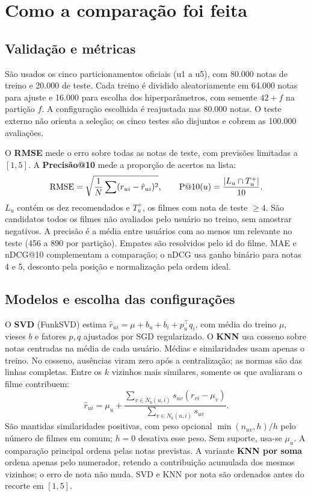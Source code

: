 \section{Como a comparação foi feita}
\subsection{Validação e métricas}
São usados os cinco particionamentos oficiais (u1 a u5), com 80.000 notas de
treino e 20.000 de teste. Cada treino é dividido aleatoriamente em 64.000
notas para ajuste e 16.000 para escolha dos hiperparâmetros, com semente
$42+f$ na partição $f$. A configuração escolhida é reajustada nas 80.000
notas. O teste externo não orienta a seleção; os cinco testes são disjuntos
e cobrem as 100.000 avaliações.

O \textbf{RMSE} mede o erro sobre todas as notas de teste, com previsões
limitadas a $[1,5]$. A \textbf{Precisão@10} mede a proporção de acertos na lista:
\[
\mathrm{RMSE}=\sqrt{\frac{1}{N}\sum(r_{ui}-\hat r_{ui})^2},\qquad
\mathrm{P}@10(u)=\frac{|L_u\cap T_u^+|}{10}.
\]
$L_u$ contém os dez recomendados e $T_u^+$, os filmes com nota de teste
$\geq4$. São candidatos todos os filmes não avaliados pelo usuário no treino,
sem amostrar negativos. A precisão é a média entre usuários com ao menos um
relevante no teste (456 a 890 por partição). Empates são resolvidos pelo id
do filme. MAE e nDCG@10 complementam a comparação; o nDCG usa ganho binário
para notas 4 e 5, desconto pela posição e normalização pela ordem ideal.

\subsection{Modelos e escolha das configurações}
O \textbf{SVD} (FunkSVD) estima $\hat r_{ui}=\mu+b_u+b_i+p_u^\top q_i$, com
média do treino $\mu$, vieses $b$ e fatores $p,q$ ajustados por SGD regularizado. O \textbf{KNN} usa
cosseno sobre notas centradas na média de cada usuário. Médias e similaridades
usam apenas o treino. No cosseno, ausências viram zero após a centralização;
as normas são das linhas completas. Entre os $k$ vizinhos mais similares,
somente os que avaliaram o filme contribuem:
\[
\hat r_{ui}=\mu_u+
\frac{\sum_{v\in N_k(u,i)}s_{uv}(r_{vi}-\mu_v)}
{\sum_{v\in N_k(u,i)}s_{uv}}.
\]
São mantidas similaridades positivas, com peso opcional
$\min(n_{uv},h)/h$ pelo número de filmes em comum; $h=0$ desativa esse peso.
Sem suporte, usa-se $\mu_u$. A comparação principal ordena pelas notas
previstas. A variante \textbf{KNN por soma} ordena apenas pelo numerador,
retendo a contribuição acumulada dos mesmos vizinhos; o erro de nota não muda.
SVD e KNN por nota são ordenados antes do recorte em $[1,5]$.

